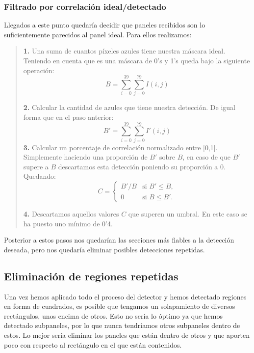 \documentclass[a4paper, 12pt]{article}
\begin{document}
\subsubsection{Filtrado por correlación ideal/detectado}
Llegados a este punto quedaría decidir que paneles recibidos son lo suficientemente parecidos al panel ideal. Para ellos realizamos:
\begin{quote}
	\textbf{1.} Una suma de cuantos píxeles azules tiene nuestra máscara ideal. Teniendo en cuenta que es una máscara de 0's y 1's queda bajo la siguiente operación:
	\begin{equation}
		B = \sum_{i = 0}^{39}\sum_{j = 0}^{79} I(i, j)
	\end{equation}
	
	\textbf{2.} Calcular la cantidad de azules que tiene nuestra detección. De igual forma que en el paso anterior:
	\begin{equation}
		B' = \sum_{i = 0}^{39}\sum_{j = 0}^{79} I'(i, j)
	\end{equation}
	\textbf{3.} Calcular un porcentaje de correlación normalizado entre [0,1]. Simplemente haciendo una proporción de $B'$ sobre $B$, en caso de que $B'$ supere a $B$ descartamos esta detección poniendo su proporción a 0. Quedando:
	\begin{equation}
		C = 
		\begin{cases} 
			B'/B & \text{si } B' \leq B, \\
			0 & \text{si } B \leq B'.
		\end{cases}
	\end{equation}
	
	\textbf{4.} Descartamos aquellos valores $C$ que superen un umbral. En este caso se ha puesto uno mínimo de 0'4.
\end{quote}

Posterior a estos pasos nos quedarían las secciones más fiables a la detección deseada, pero nos quedaría eliminar posibles detecciones repetidas.
\subsection{Eliminación de regiones repetidas}
Una vez hemos aplicado todo el proceso del detector y hemos detectado regiones en forma de cuadrados, es posible que tengamos un solapamiento de diversos rectángulos, unos encima de otros. Esto no sería lo óptimo ya que hemos detectado subpaneles, por lo que nunca tendríamos otros subpaneles dentro de estos. Lo mejor sería eliminar los paneles que están dentro de otros y que aporten poco con respecto al rectángulo en el que están contenidos.
\end{document}
